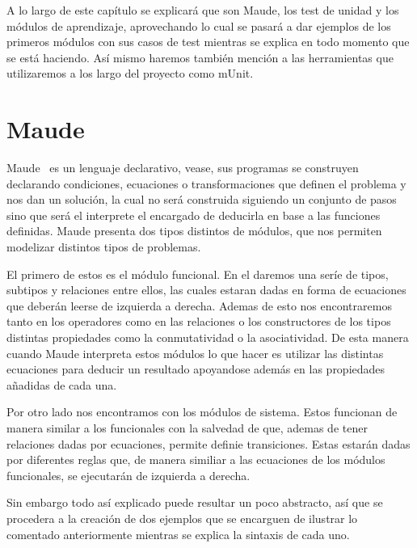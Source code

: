 
A lo largo de este capítulo se explicará que son Maude, los test de unidad y los módulos de aprendizaje, aprovechando lo cual se pasará a dar ejemplos de los primeros módulos con sus casos de test mientras se explica en todo momento que se está haciendo. Así mismo haremos también mención a las herramientas que utilizaremos a los largo del proyecto como mUnit.\par

\section{Maude}

Maude~\cite{maudeBook} es un lenguaje declarativo, vease, sus programas se construyen declarando condiciones, ecuaciones o transformaciones que definen el problema y nos dan un solución, la cual no será construida siguiendo un conjunto de pasos sino que será el interprete el encargado de deducirla en base a las funciones definidas. Maude presenta dos tipos distintos de módulos, que nos permiten modelizar distintos tipos de problemas.\par

El primero de estos es el módulo funcional. En el daremos una seríe de tipos, subtipos y relaciones entre ellos, las cuales estaran dadas en forma de ecuaciones que deberán leerse de izquierda a derecha. Ademas de esto nos encontraremos tanto en los operadores como en las relaciones o los constructores de los tipos distintas propiedades como la conmutatividad o la asociatividad. De esta manera cuando Maude interpreta estos módulos lo que hacer es utilizar las distintas ecuaciones para deducir un resultado apoyandose además en las propiedades añadidas de cada una.\par

Por otro lado nos encontramos con los módulos de sistema. Estos funcionan de manera similar a los funcionales con la salvedad de que, ademas de tener relaciones dadas por ecuaciones, permite definie transiciones. Estas estarán dadas por diferentes reglas que, de manera similiar a las ecuaciones de los módulos funcionales, se ejecutarán de izquierda a derecha.\par

Sin embargo todo así explicado puede resultar un poco abstracto, así que se procedera a la creación de dos ejemplos que se encarguen de ilustrar lo comentado anteriormente mientras se explica la sintaxis de cada uno. \par

